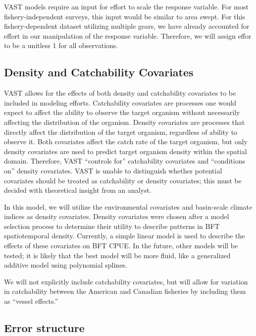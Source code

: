 \documentclass[
]{article}
\begin{document}
VAST models require an input for effort to scale the response variable. For most fishery-independent surveys, this input would be similar to area swept. For this fishery-dependent dataset utilizing multiple gears, we have already accounted for effort in our manipulation of the response variable. Therefore, we will assign effor to be a unitless 1 for all observations.

\hypertarget{density-and-catchability-covariates}{%
\subsection{Density and Catchability Covariates}\label{density-and-catchability-covariates}}

VAST allows for the effects of both density and catchability covariates to be included in modeling efforts. Catchability covariates are processes one would expect to affect the ability to observe the target organism without necessarily affecting the distribution of the organism. Density covariates are processes that directly affect the distribution of the target organism, regardless of ability to observe it. Both covariates affect the catch rate of the target organism, but only density covariates are used to predict target organism density within the spatial domain. Therefore, VAST ``controls for'' catchability covariates and ``conditions on'' density covariates. VAST is unable to distinguish whether potential covariates should be treated as catchability or density covariates; this must be decided with theoretical insight from an analyst.

In this model, we will utilize the environmental covariates and basin-scale climate indices as density covariates. Density covariates were chosen after a model selection process to determine their utility to describe patterns in BFT spatiotemporal density. Currently, a simple linear model is used to describe the effects of these covariates on BFT CPUE. In the future, other models will be tested; it is likely that the best model will be more fluid, like a generalized additive model using polynomial splines.

We will not explicitly include catchability covariates, but will allow for variation in catchability between the American and Canadian fisheries by including them as ``vessel effects.''

\hypertarget{error-structure}{%
\subsection{Error structure}\label{error-structure}}
\end{document}

